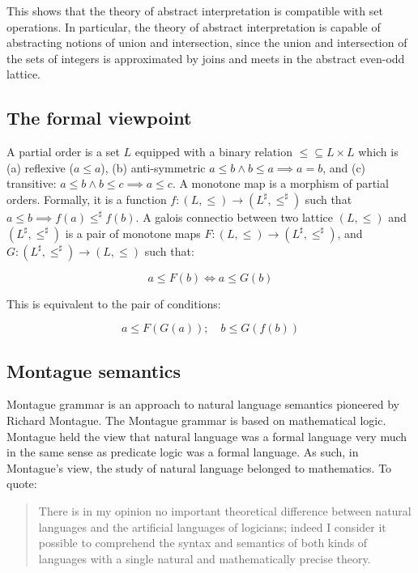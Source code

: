 \documentclass[11pt]{book}
\begin{document}
This shows that the theory of abstract interpretation is compatible with set
operations. In particular, the theory of abstract interpretation is capable of
abstracting notions of union and intersection, since the union and intersection
of the sets of integers is approximated by joins and meets in the abstract even-odd
lattice.


\subsection{The formal viewpoint}

A partial order is a set $L$ equipped with a binary relation $\leq \subseteq L
\times L$ which is (a) reflexive ($a \leq a$), (b) anti-symmetric $a \leq b
\land b \leq a \implies a = b$, and (c) transitive: $a \leq b \land b \leq c
\implies a \leq c$.  A monotone map is a morphism of partial orders. Formally,
it is a function $f: (L, \leq) \rightarrow (L^\sharp, \leq^\sharp)$ such that
$a \leq b \implies f(a) \leq^\sharp f(b)$.  A galois connectio between two
lattice $(L, \leq)$ and $(L^\sharp, \leq^\sharp)$ is a pair of monotone maps
$F: (L, \leq) \rightarrow (L^\sharp, \leq^\sharp)$, and
$G: (L^\sharp, \leq^\sharp) \rightarrow  (L, \leq)$ such that:

$$
a \leq F(b) \iff a \leq G(b)
$$

This is equivalent to the pair of conditions:

$$
a \leq F(G(a)); \quad b \leq G(f(b))
$$


\subsection{Montague semantics}

Montague grammar is an approach to natural language semantics pioneered by
Richard Montague.  The Montague grammar is based on mathematical logic.
Montague held the view that natural language was a formal language very much in
the same sense as predicate logic was a formal language. As such, in Montague’s
view, the study of natural language belonged to mathematics. To quote:

\begin{quote}
There is in my opinion no important theoretical difference between natural
languages and the artificial languages of logicians; indeed I consider it
possible to comprehend the syntax and semantics of both kinds of languages
with a single natural and mathematically precise theory.
\end{quote}
\end{document}
